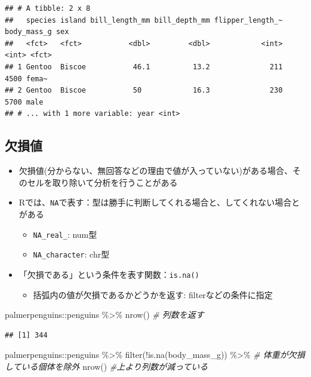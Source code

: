 \documentclass[
]{ltjsarticle}
\newenvironment{Shaded}{\begin{snugshade}}{\end{snugshade}}
\newcommand{\CommentTok}[1]{\textcolor[rgb]{0.56,0.35,0.01}{\textit{#1}}}
\newcommand{\FunctionTok}[1]{\textcolor[rgb]{0.00,0.00,0.00}{#1}}
\newcommand{\NormalTok}[1]{#1}
\newcommand{\SpecialCharTok}[1]{\textcolor[rgb]{0.00,0.00,0.00}{#1}}
\providecommand{\tightlist}{%
  \setlength{\itemsep}{0pt}\setlength{\parskip}{0pt}}
\begin{document}
\begin{verbatim}
## # A tibble: 2 x 8
##   species island bill_length_mm bill_depth_mm flipper_length_~ body_mass_g sex  
##   <fct>   <fct>           <dbl>         <dbl>            <int>       <int> <fct>
## 1 Gentoo  Biscoe           46.1          13.2              211        4500 fema~
## 2 Gentoo  Biscoe           50            16.3              230        5700 male 
## # ... with 1 more variable: year <int>
\end{verbatim}

\hypertarget{ux6b20ux640dux5024}{%
\subsection{欠損値}\label{ux6b20ux640dux5024}}

\begin{itemize}
\tightlist
\item
  欠損値(分からない、無回答などの理由で値が入っていない)がある場合、そのセルを取り除いて分析を行うことがある
\item
  Rでは、\texttt{NA}で表す：型は勝手に判断してくれる場合と、してくれない場合とがある

  \begin{itemize}
  \tightlist
  \item
    \texttt{NA\_real\_}: num型
  \item
    \texttt{NA\_character}: chr型
  \end{itemize}
\item
  「欠損である」という条件を表す関数：\texttt{is.na()}

  \begin{itemize}
  \tightlist
  \item
    括弧内の値が欠損であるかどうかを返す: filterなどの条件に指定
  \end{itemize}
\end{itemize}

\begin{Shaded}
\begin{Highlighting}[]
\NormalTok{palmerpenguins}\SpecialCharTok{::}\NormalTok{penguins }\SpecialCharTok{\%\textgreater{}\%} \FunctionTok{nrow}\NormalTok{() }\CommentTok{\# 列数を返す}
\end{Highlighting}
\end{Shaded}

\begin{verbatim}
## [1] 344
\end{verbatim}

\begin{Shaded}
\begin{Highlighting}[]
\NormalTok{palmerpenguins}\SpecialCharTok{::}\NormalTok{penguins }\SpecialCharTok{\%\textgreater{}\%}
  \FunctionTok{filter}\NormalTok{(}\SpecialCharTok{!}\FunctionTok{is.na}\NormalTok{(body\_mass\_g)) }\SpecialCharTok{\%\textgreater{}\%} \CommentTok{\# 体重が欠損している個体を除外}
  \FunctionTok{nrow}\NormalTok{() }\CommentTok{\#上より列数が減っている}
\end{Highlighting}
\end{Shaded}
\end{document}
